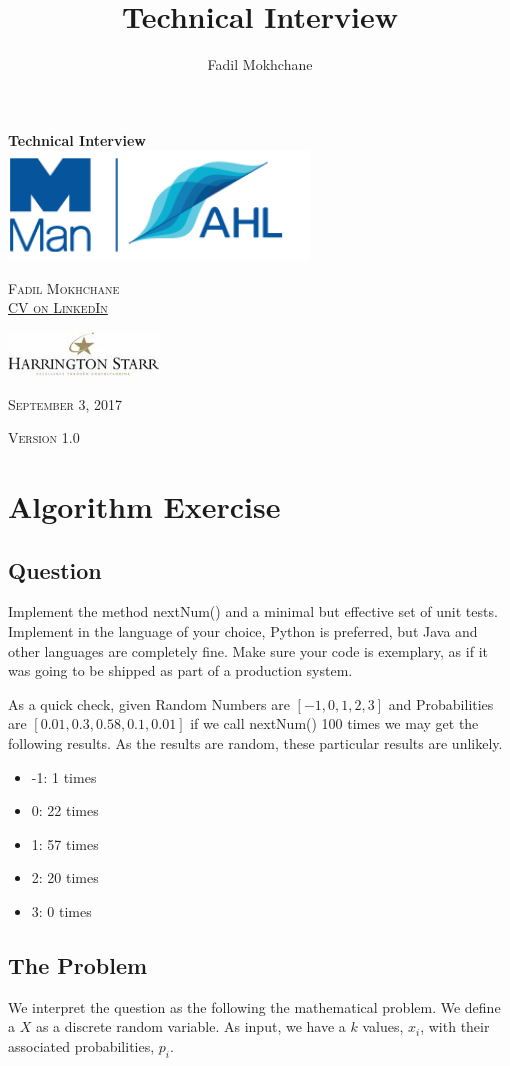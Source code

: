 \documentclass[12pt,a4paper,article]{memoir} %
\title{Technical Interview}
\author{Fadil Mokhchane}
\newlength\drop
\newcommand*\titleM{\begingroup%
\setlength\drop{0.08\textheight}
\centering
\vspace*{\drop}
{\Huge\bfseries Technical Interview}\\[\baselineskip]
\vfill
\includegraphics[width=0.6\textwidth]{img/logo.png}\par\vspace{1cm}
\vfill
{\Huge\scshape Fadil Mokhchane \\ 
\small \href{https://www.linkedin.com/in/fadil/}{CV on LinkedIn} }\par
\vspace{1cm}
\includegraphics[width=0.3\textwidth]{img/harrington.jpg}\par
\vfill
\vspace*{2\drop}
{\scshape September 3, 2017}\par
{\scshape \small Version 1.0}\par
\endgroup}
\begin{document}
\begin{titlingpage}
\titleM
\end{titlingpage}

\newpage
\tableofcontents* %
{}
\listoffigures
\newpage

\chapter{Algorithm Exercise}
\section{Question}
Implement the method nextNum() and a minimal but effective set of unit tests. 
Implement in the language of your choice, Python is preferred, but Java and 
other languages are completely fine. 
Make sure your code is exemplary, as if it was going to be shipped as part of a production system.

As a quick check, given Random Numbers are $[-1, 0, 1, 2, 3]$ and 
Probabilities are $[0.01, 0.3, 0.58, 0.1, 0.01]$ if we call nextNum() 100 times 
we may get the following results. As the results are random, these particular results are unlikely.
\begin{itemize}
	\item -1: 1 times 
	\item 0: 22 times
	\item 1: 57 times 
	\item 2: 20 times
	\item 3: 0 times 
\end{itemize}

\section{The Problem}
\label{sec:problem}
We interpret the question as the following the mathematical problem. 
We define a $X$ as a discrete random variable. 
As input, we have a $k$ values, $x_i$, with their associated probabilities, $p_i$.
\end{document}
